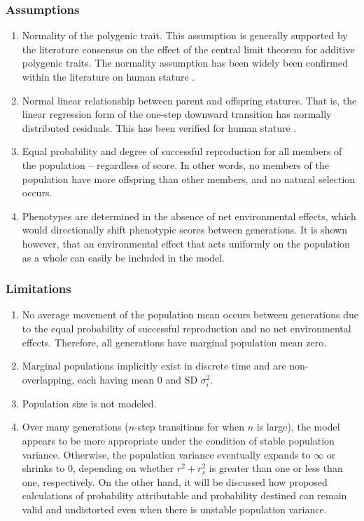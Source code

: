 \documentclass[letterpaper,10pt]{article} %
\begin{document}
\subsubsection*{Assumptions}
\begin{enumerate}
\item Normality of the polygenic trait. This assumption is generally supported by the literature consensus on the effect of the central limit theorem for additive polygenic traits. The normality assumption has been widely been confirmed within the literature on human stature \cite{luo}.
\item Normal linear relationship between parent and offspring statures. That is, the linear regression form of the one-step downward transition has normally distributed residuals. This has been verified for human stature \cite{luo}.
\item Equal probability and degree of successful reproduction for all members of the population -- regardless of score. In other words, no members of the population have more offspring than other members, and no natural selection occurs. 
\item Phenotypes are determined in the absence of net environmental effects, which would directionally shift phenotypic scores between generations. It is shown however, that an environmental effect that acts uniformly on the population as a whole can easily be included in the model. 
\end{enumerate}

\subsubsection*{Limitations}
\begin{enumerate}
\item No average movement of the population mean occurs between generations due to the equal probability of successful reproduction and no net environmental effects. Therefore, all generations have marginal population mean zero.
\item Marginal populations implicitly exist in discrete time and are non-overlapping, each having mean $0$ and SD $\sigma_i^2$.
\item Population size is not modeled. 
\item Over many generations ($n$-step transitions for when $n$ is large), the model appears to be more appropriate under the condition of stable population variance. Otherwise, the population variance eventually expands to $\infty$ or shrinks to $0$, depending on whether $r^2 + r_s^2$ is greater than one or less than one, respectively. On the other hand, it will be discussed how proposed calculations of probability attributable and probability destined can remain valid and undistorted even when there is unstable population variance.
\end{enumerate}
\end{document}
